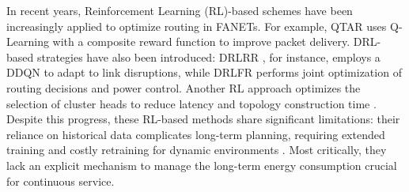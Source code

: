 \documentclass[runningheads]{llncs}
\begin{document}
In recent years, Reinforcement Learning (RL)-based schemes have been increasingly applied to optimize routing in FANETs. For example, QTAR \cite{qtar} uses Q-Learning with a composite reward function to improve packet delivery. DRL-based strategies have also been introduced: DRLRR \cite{DRLRR}, for instance, employs a DDQN to adapt to link disruptions, while DRLFR \cite{DRLFR} performs joint optimization of routing decisions and power control. Another RL approach optimizes the selection of cluster heads to reduce latency and topology construction time \cite{related1}. Despite this progress, these RL-based methods share significant limitations: their reliance on historical data complicates long-term planning, requiring extended training and costly retraining for dynamic environments \cite{intro11}. Most critically, they lack an explicit mechanism to manage the long-term energy consumption crucial for continuous service.
\end{document}
